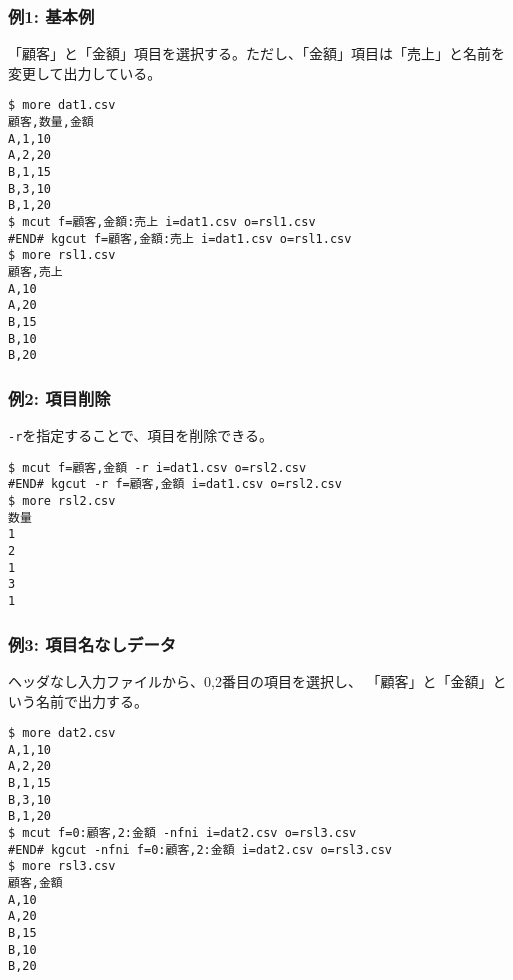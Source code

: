 \subsubsection*{例1: 基本例}

「顧客」と「金額」項目を選択する。ただし、「金額」項目は「売上」と名前を変更して出力している。


\begin{Verbatim}[baselinestretch=0.7,frame=single]
$ more dat1.csv
顧客,数量,金額
A,1,10
A,2,20
B,1,15
B,3,10
B,1,20
$ mcut f=顧客,金額:売上 i=dat1.csv o=rsl1.csv
#END# kgcut f=顧客,金額:売上 i=dat1.csv o=rsl1.csv
$ more rsl1.csv
顧客,売上
A,10
A,20
B,15
B,10
B,20
\end{Verbatim}
\subsubsection*{例2: 項目削除}

\verb|-r|を指定することで、項目を削除できる。


\begin{Verbatim}[baselinestretch=0.7,frame=single]
$ mcut f=顧客,金額 -r i=dat1.csv o=rsl2.csv
#END# kgcut -r f=顧客,金額 i=dat1.csv o=rsl2.csv
$ more rsl2.csv
数量
1
2
1
3
1
\end{Verbatim}
\subsubsection*{例3: 項目名なしデータ}

ヘッダなし入力ファイルから、0,2番目の項目を選択し、
「顧客」と「金額」という名前で出力する。


\begin{Verbatim}[baselinestretch=0.7,frame=single]
$ more dat2.csv
A,1,10
A,2,20
B,1,15
B,3,10
B,1,20
$ mcut f=0:顧客,2:金額 -nfni i=dat2.csv o=rsl3.csv
#END# kgcut -nfni f=0:顧客,2:金額 i=dat2.csv o=rsl3.csv
$ more rsl3.csv
顧客,金額
A,10
A,20
B,15
B,10
B,20
\end{Verbatim}
